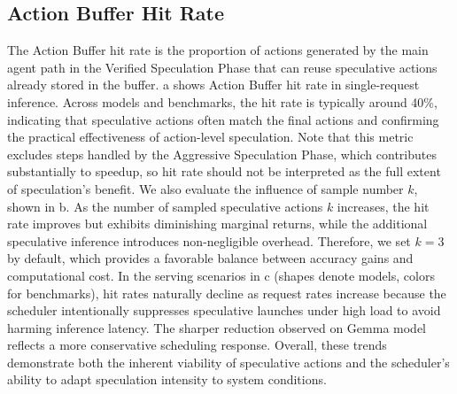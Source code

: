 \subsection{Action Buffer Hit Rate}

The Action Buffer hit rate is the proportion of actions generated by the main agent path in the Verified Speculation Phase that can reuse speculative actions already stored in the buffer.
a shows Action Buffer hit rate in single-request inference. 
Across models and benchmarks, the hit rate is typically around 40\%, indicating that speculative actions often match the final actions and confirming the practical effectiveness of action-level speculation. 
Note that this metric excludes steps handled by the Aggressive Speculation Phase, which contributes substantially to speedup, so hit rate should not be interpreted as the full extent of speculation’s benefit.
We also evaluate the influence of sample number $k$, shown in b.
As the number of sampled speculative actions $k$ increases, the hit rate improves but exhibits diminishing marginal returns, while the additional speculative inference introduces non-negligible overhead. 
Therefore, we set $k=3$ by default, which provides a favorable balance between accuracy gains and computational cost.
In the serving scenarios in c (shapes denote models, colors for benchmarks), hit rates naturally decline as request rates increase because the scheduler intentionally suppresses speculative launches under high load to avoid harming inference latency. 
The sharper reduction observed on Gemma model reflects a more conservative scheduling response. 
Overall, these trends demonstrate both the inherent viability of speculative actions and the scheduler’s ability to adapt speculation intensity to system conditions.
